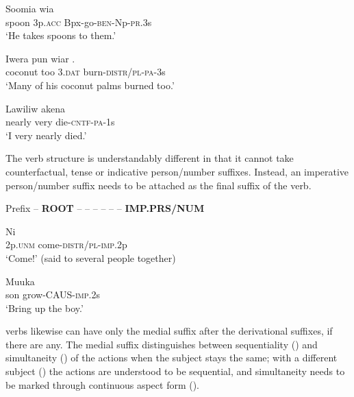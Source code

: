\ea%
\label{ex:x180}
\gll Soomia wia  \\
spoon 3p.\textsc{acc} Bpx-go-\textsc{ben}-Np-\textsc{pr}.3s\\
\glt`He takes spoons to them.'
\z

\ea%
\label{ex:x181}
\gll Iwera pun wiar . \\
coconut too 3.\textsc{dat} burn-\textsc{distr}/\textsc{pl}-\textsc{pa}-3s\\
\glt`Many of his coconut palms burned too.'
\z

\ea%
\label{ex:x182}
\gll Lawiliw akena  \\
nearly very die-\textsc{cntf}-\textsc{pa}-1s \\
\glt`I very nearly died.'
\z

The  verb structure is understandably different in that it cannot take counterfactual, tense or indicative person/number suffixes. Instead, an imperative person/number suffix needs to be attached as the final suffix of the verb.

Prefix -- \textbf{ROOT} --  --  --  --  --  -- \textbf{IMP.PRS/NUM}

\ea%
\label{ex:x183}
\gll Ni  \\
2p.\textsc{unm} come-\textsc{distr}/\textsc{pl}-\textsc{imp}.2p\\
\glt`Come!' (said to several people together) 
\z

\ea%
\label{ex:x184}
\gll Muuka  \\
son grow-CAUS-\textsc{imp}.2s \\
\glt`Bring up the boy.' 
\z

 verbs likewise can have only the medial suffix after the derivational suffixes, if there are any. The medial suffix distinguishes between sequentiality () and simultaneity () of the actions when the subject stays the same; with a different subject () the actions are understood to be sequential, and simultaneity needs to be marked through continuous aspect form ().
 
